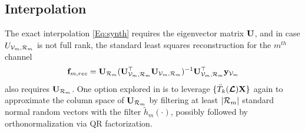 \documentclass[journal, 10pt]{IEEEtran}
\begin{document}




\subsection{Interpolation}
The exact interpolation \eqref{Eq:synth} requires the eigenvector matrix ${\bf U}$, and in case $U_{\V_m,{\cal R}_m}$ is not full rank, the standard least squares reconstruction for the $m^{th}$ channel
\begin{align}
{\bf f}_{m,{rec}}=\mathbf{U}_{{\cal R}_m}(\mathbf{U}_{\V_m,{\cal R}_m}^{\top}\mathbf{U}_{\V_m,{\cal R}_m})^{-1}\mathbf{U}_{\V_m,{\cal R}_m}^{\top}{\bf y}_{\V_m}
\end{align}
also requires ${\bf U}_{{\cal R}_m}$. One option explored in \cite{halko,paratte} is to leverage $\{\bar{T}_k(\boldsymbol{\mathcal{L}}){\bf X}\}$ again to approximate the column space of ${\bf U}_{{\cal R}_m}$ by filtering at least $|{\cal R}_m|$ standard normal random vectors with the filter $\tilde{h}_m(\cdot)$, possibly followed by orthonormalization via QR factorization.
\end{document}
